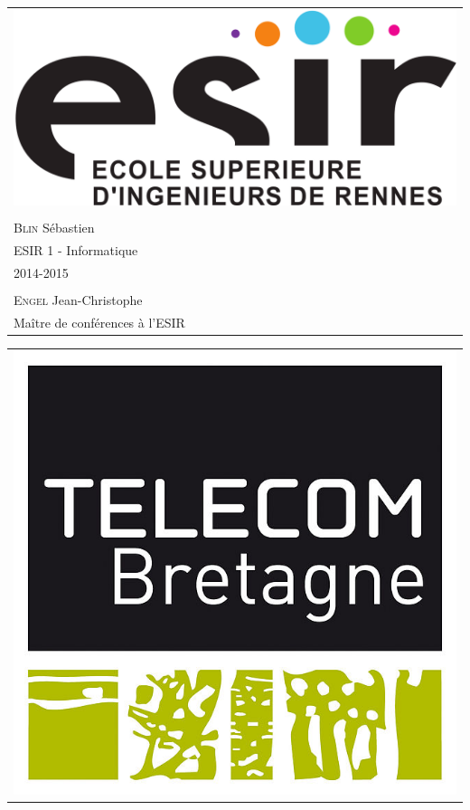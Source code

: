 \documentclass{article}
\begin{document}
\begin{titlepage}
	\vspace{-20px}
	\begin{tabular}{l}
		\includegraphics[scale=0.1]{esir.png}\\
		\\
		\textsc{Blin} S\'ebastien\\
		ESIR 1 - Informatique\\
		2014-2015\\
		\\
		\textsc{Engel} Jean-Christophe\\
		Maître de conférences à l'ESIR
	\end{tabular}
	\hfill
	\begin{tabular}{l}
		\includegraphics[scale=0.5]{telecom}\\

\end{tabular}
\end{titlepage}
\end{document}
